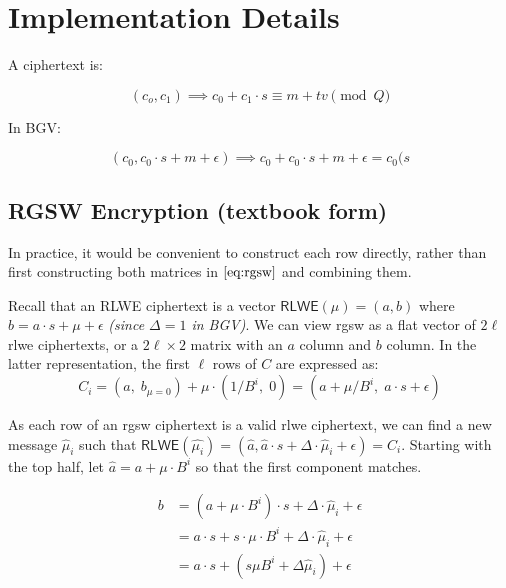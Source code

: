 \section{Implementation Details}

A ciphertext is:

\begin{equation}
    (c_o, c_1) \implies c_0 + c_1\cdot s \equiv m + tv \pmod{Q}
\end{equation}

In BGV:

\begin{equation}
    (c_0, c_0\cdot s + m + \epsilon) \implies c_0 + c_0\cdot s + m + \epsilon = c_0(s
\end{equation}


\subsection{RGSW Encryption (textbook form)}
\label{sec:impl:rgsw}

In practice, it would be convenient to construct each row directly, rather than first constructing both matrices in $\eqref{eq:rgsw}$ and combining them.

Recall that an RLWE ciphertext is a vector $\mathsf{RLWE}(\mu) = (a, b)$ where $b=a\cdot s + \mu + \epsilon$ \textit{(since $\Delta = 1$ in BGV)}. We can view \gls{rgsw} as a flat vector of $2\ell$ \gls{rlwe} ciphertexts, or a $2\ell \times 2$ matrix with an $a$ column and $b$ column. In the latter representation, the first $\ell$ rows of $C$ are expressed as:
\begin{equation*}
    C_i =
    (a,\; b_{\mu=0}) +
    \mu \cdot (1/B^{i},\; 0)
    =
    (a + \mu/B^{i},\; a\cdot s + \epsilon)
\end{equation*}

As each row of an \gls{rgsw} ciphertext is a valid \gls{rlwe} ciphertext, we can find a new message $\hat{\mu}_i$ such that $\mathsf{RLWE}(\hat{\mu_i}) = (\hat{a}, \hat{a}\cdot s + \Delta \cdot\hat{\mu}_i + \epsilon) = C_i$. Starting with the top half, let $\hat{a} = a + \mu\cdot B^{i}$ so that the first component matches.

\begin{align}
    b &= (a + \mu\cdot B^{i})\cdot s + \Delta \cdot \hat{\mu}_i + \epsilon \\
      &= a\cdot s + s\cdot \mu \cdot B^{i} + \Delta \cdot \hat{\mu}_i + \epsilon \\
      &= a\cdot s + (s\mu B^{i} + \Delta{\hat{\mu}}_i) + \epsilon
\end{align}

